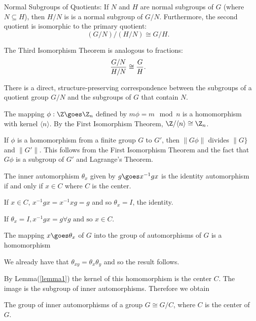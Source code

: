 \begin{theorem} Normal Subgroups of Quotients: If $N$ and $H$ are normal subgroups of $G$ (where $N \subseteq H$), then 
$H/N$ is  is a normal subgroup of $G/N$. Furthermore, the second quotient is 
isomorphic to the primary quotient: \[ (G / N )/  (H / N)  \cong G / H. \]
\end{theorem}
The Third Isomorphism Theorem is analogous to fractions:
\[ {G / N \over H / N} \cong {G\over H}.\]

\begin{theorem} 
There is a direct, structure-preserving correspondence between the subgroups of a quotient group $G / N$
 and the subgroups of $G$
 that contain $N$.
\end{theorem}

\begin{theorem}
The mapping $\phi: \Z\goes\Z_n$ defined by $m\phi = m\mod n$ is a homomorphism with kernel $\langle n \rangle$. By the 
First Isomorphism Theorem, $\Z/\langle n\rangle \cong \Z_n$. 
\end{theorem}

If $\phi$ is a homomorphism from a finite group $G$ to $G'$, then $\|G\phi\|$ divides $\|G\}$ and $\|G'\|$. This follows from 
the First Isomorphism Theorem and the fact that $G\phi$ is a subgroup of $G'$ and Lagrange's Theorem. 

\begin{lemma}
The inner automorphism $\theta_x$ given by $g \goes x^{-1} g x$ is the identity automorphism if and only if $x\in C$ where $C$ is the center. 
\label{lemma1}\end{lemma}
If $x\in C$, $x^{-1} g x = x^{-1} x g = g$ and so $\theta_x = I$, the identity. 

If $\theta_x = I, x^{-1} g x = g \forall g \mbox{   and so  } x\in C$.

\begin{lemma}
The mapping $x \goes \theta_x$ of $G$ into the group of automorphisms of $G$ is a homomorphism
\end{lemma}
We already have that $\theta_{xy} = \theta_x\theta_y$ and so the result follows. 

By Lemma(\ref{lemma1}) the kernel of this homomorphism is the center $C$. The image is the subgroup of inner automorphisms. Therefore we obtain
\begin{theorem}
The group of inner automorphisms of a group $G \cong G/C$, where $C$ is the center of $G$.
\end{theorem}